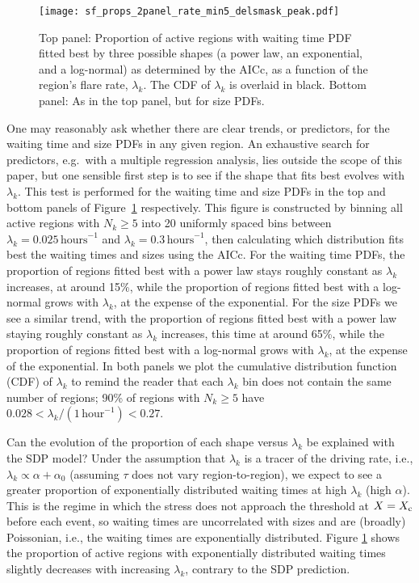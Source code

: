 \begin{figure}
\centering
\texttt{[image: sf\_props\_2panel\_rate\_min5\_delsmask\_peak.pdf]}
\caption{Top panel: Proportion of active regions with waiting time PDF fitted best by three possible shapes (a power law, an exponential, and a log-normal) as determined by the AICc, as a function of the region's flare rate, $\lambda_k$. The CDF of $\lambda_k$ is overlaid in black. Bottom panel: As in the top panel, but for size PDFs.}
\label{fig:sf_prop_both}
\end{figure}

One may reasonably ask whether there are clear trends, or predictors, for the waiting time and size PDFs in any given region. An exhaustive search for predictors, e.g.~with a multiple regression analysis, lies outside the scope of this paper, but one sensible first step is to see if the shape that fits best evolves with $\lambda_k$. This test is performed for the waiting time and size PDFs in the top and bottom panels of Figure~\ref{fig:sf_prop_both} respectively. This figure is constructed by binning all active regions with $N_k \geq 5$ into 20 uniformly spaced bins between $\lambda_k = 0.025\,\textrm{hours}^{-1}$ and $\lambda_k = 0.3\,\textrm{hours}^{-1}$, then calculating which distribution fits best the waiting times and sizes using the AICc. For the waiting time PDFs, the proportion of regions fitted best with a power law stays roughly constant as $\lambda_k$ increases, at around 15\%, while the proportion of regions fitted best with a log-normal grows with $\lambda_k$, at the expense of the exponential. For the size PDFs we see a similar trend, with the proportion of regions fitted best with a power law staying roughly constant as $\lambda_k$ increases, this time at around 65\%, while the proportion of regions fitted best with a log-normal grows with $\lambda_k$, at the expense of the exponential. In both panels we plot the cumulative distribution function (CDF) of $\lambda_k$ to remind the reader that each $\lambda_k$ bin does not contain the same number of regions; 90\% of regions with $N_k \geq 5$ have $0.028 < \lambda_k / (1\,\textrm{hour}^{-1}) < 0.27$.

Can the evolution of the proportion of each shape versus $\lambda_k$ be explained with the SDP model? Under the assumption that $\lambda_k$ is a tracer of the driving rate, i.e., $\lambda_k \propto \alpha + \alpha_0$ (assuming $\tau$ does not vary region-to-region), we expect to see a greater proportion of exponentially distributed waiting times at high $\lambda_k$ (high $\alpha$). This is the regime in which the stress does not approach the threshold at $X = X_\textrm{c}$ before each event, so waiting times are uncorrelated with sizes and are (broadly) Poissonian, i.e., the waiting times are exponentially distributed. Figure \ref{fig:sf_prop_both} shows the proportion of active regions with exponentially distributed waiting times slightly decreases with increasing $\lambda_k$, contrary to the SDP prediction.

